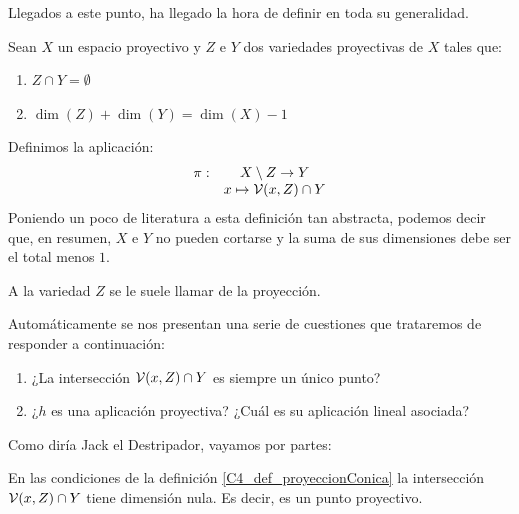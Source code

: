 Llegados a este punto, ha llegado la hora de definir  en toda su generalidad.
\begin{defi}
	\label{C4_def_proyeccionConica}
	Sean $X$ un espacio proyectivo y $Z$ e $Y$ dos variedades proyectivas de $X$ tales que:
	\begin{enumerate}
		\item $Z\cap Y=\emptyset$
		\item $\dim(Z)+\dim(Y)=\dim(X)-1$
	\end{enumerate}
	Definimos la aplicación:
	\[\begin{array}{cc}
	\pi:&X\setminus Z\to Y\\
	&x\mapsto\mathcal{V}(x,Z)\cap Y
	\end{array}\]
	Poniendo un poco de literatura a esta definición tan abstracta, podemos decir que, en resumen, $X$ e $Y$ no pueden cortarse y la suma de sus dimensiones debe ser el total menos $1$.
	
	A la variedad $Z$ se le suele llamar  de la proyección.
\end{defi}
Automáticamente se nos presentan una serie de cuestiones que trataremos de responder a continuación:
\begin{enumerate}
	\item ¿La intersección $\mathcal{V}(x,Z)\cap Y$ es siempre un único punto?
	\item ¿$h$ es una aplicación proyectiva? ¿Cuál es su aplicación lineal asociada?
\end{enumerate}
Como diría Jack el Destripador, vayamos por partes:
\begin{prop}
	\label{C4_prop_interseccionUnipuntual}
	En las condiciones de la definición \ref{C4_def_proyeccionConica} la intersección $\mathcal{V}(x,Z)\cap Y$ tiene dimensión nula. Es decir, es un punto proyectivo.
\end{prop}
